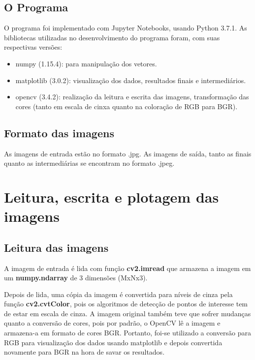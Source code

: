 \documentclass{article}
\begin{document}
\subsection{O Programa}

O programa foi implementado com Jupyter Notebooks, usando Python 3.7.1. As bibliotecas utilizadas no desenvolvimento do programa foram, com suas respectivas versões: 

\begin{itemize}
    \item numpy (1.15.4): para manipulação dos vetores.

    \item matplotlib (3.0.2): visualização dos dados, resultados finais e intermediários.

    \item opencv (3.4.2): realização da leitura e escrita das imagens, transformação das cores (tanto em escala de cinxa quanto na coloração de RGB para BGR).

\end{itemize}

\subsection{Formato das imagens}

As imagens de entrada estão no formato .jpg. As imagens de saída, tanto as finais quanto as intermediárias se encontram no formato .jpeg.

\section{Leitura, escrita e plotagem das imagens}

\subsection{Leitura das imagens}

A imagem de entrada é lida com função \textbf{cv2.imread} que armazena a imagem em um \textbf{numpy.ndarray} de 3 dimensões (MxNx3).

Depois de lida, uma cópia da imagem é convertida para níveis de cinza pela função \textbf{cv2.cvtColor}, pois os algoritmos de detecção de pontos de interesse tem de estar em escala de cinza. A imagem original também teve que sofrer mudanças quanto a conversão de cores, pois por padrão, o OpenCV lê a imagem e armazena-a em formato de cores BGR. Portanto, foi-se utilizado a conversão para RGB para visualização dos dados usando matplotlib e depois convertida novamente para BGR na hora de savar os resultados.
\end{document}
